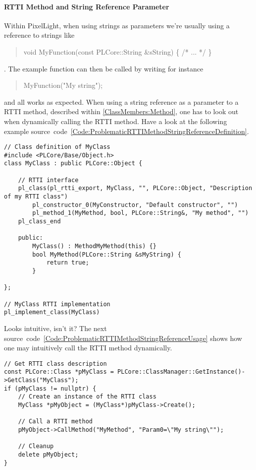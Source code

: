 \paragraph{RTTI Method and String Reference Parameter}
\label{Appendix:CommonPitfalls:RTTIMethodStringReferenceParameter}
Within PixelLight, when using strings as parameters we're usually using a reference to strings like \begin{quote}void MyFunction(const PLCore::String \&sString) \{ /* ... */ \}\end{quote}. The example function can then be called by writing for instance \begin{quote}MyFunction("My string");\end{quote} and all works as expected. When using a string reference as a parameter to a RTTI method, described within \ref{ClassMembers:Method}, one has to look out when dynamically calling the RTTI method. Have a look at the following example source~code~\ref{Code:ProblematicRTTIMethodStringReferenceDefinition}.
\begin{lstlisting}[label=Code:ProblematicRTTIMethodStringReferenceDefinition,caption={Problematic RTTI method and string reference parameter definition}]
// Class definition of MyClass
#include <PLCore/Base/Object.h>
class MyClass : public PLCore::Object {

	// RTTI interface
	pl_class(pl_rtti_export, MyClass, "", PLCore::Object, "Description of my RTTI class")
		pl_constructor_0(MyConstructor, "Default constructor", "")
		pl_method_1(MyMethod, bool, PLCore::String&, "My method", "")
	pl_class_end

	public:
		MyClass() : MethodMyMethod(this) {}
		bool MyMethod(PLCore::String &sMyString) {
			return true;
		}

};

// MyClass RTTI implementation
pl_implement_class(MyClass)
\end{lstlisting}
Looks intuitive, isn't it? The next source~code~\ref{Code:ProblematicRTTIMethodStringReferenceUsage} shows how one may intuitively call the RTTI method dynamically.
\begin{lstlisting}[label=Code:ProblematicRTTIMethodStringReferenceUsage,caption={Problematic RTTI method and string reference parameter usage}]
// Get RTTI class description
const PLCore::Class *pMyClass = PLCore::ClassManager::GetInstance()->GetClass("MyClass");
if (pMyClass != nullptr) {
	// Create an instance of the RTTI class
	MyClass *pMyObject = (MyClass*)pMyClass->Create();

	// Call a RTTI method
	pMyObject->CallMethod("MyMethod", "Param0=\"My string\"");

	// Cleanup
	delete pMyObject;
}
\end{lstlisting}
